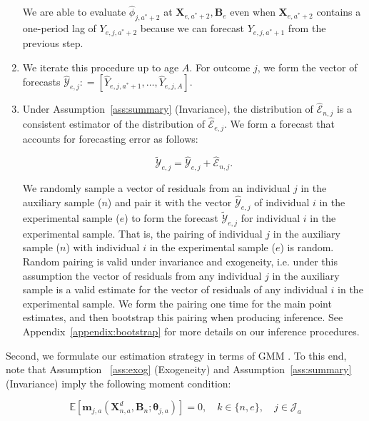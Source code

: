 \begin{enumerate}
\noindent We are able to evaluate $\hat{\phi}_{j,a^*+2}$ at $ \bm{X}_{e,a^*+2}, \bm{B}_e $ even when $\bm{X}_{e,a^*+2}$ contains a one-period lag of $Y_{e,j,a^*+2}$ because we can forecast $Y_{e,j,a^*+1}$ from the previous step.

\item We iterate this procedure up to age $A$. For outcome $j$, we form the vector of forecasts $\hat{\mathcal{Y}}_{e,j} : = \left[ \hat{Y}_{e,j,a^*+1}, \ldots,  \hat{Y}_{e,j,A} \right]$.

\item Under Assumption~\ref{ass:summary} (Invariance), the distribution of $\hat{\mathcal{E}}_{n,j}$ is a consistent estimator of the distribution of $\hat{\mathcal{E}}_{e,j}$. We form a forecast that accounts for forecasting error as follows:

\begin{equation}
\tilde{\mathcal{Y}}_{e,j} = \hat{\mathcal{Y}}_{e,j} + \hat{\mathcal{E}}_{n,j}.
\end{equation}

\noindent We randomly sample a vector of residuals from an individual $j$ in the auxiliary sample ($n$) and pair it with the vector $\hat{\mathcal{Y}}_{e,j}$ of individual $i$ in the experimental sample ($e$) to form the forecast $\tilde{\mathcal{Y}}_{e,j}$ for individual $i$ in the experimental sample. That is, the pairing of individual $j$ in the auxiliary sample ($n$) with individual $i$ in the experimental sample ($e$) is random. Random pairing is valid under invariance and exogeneity, i.e. under this assumption the vector of residuals from any individual $j$ in the auxiliary sample is a valid estimate for the vector of residuals of any individual $i$ in the experimental sample. We form the pairing one time for the main point estimates, and then bootstrap this pairing when producing inference. See Appendix~\ref{appendix:bootstrap} for more details on our inference procedures.
\end{enumerate}

\noindent Second, we formulate our estimation strategy in terms of GMM \citep{Hansen_1982_Econometrica}. To this end, note that Assumption ~\ref{ass:exog} (Exogeneity) and Assumption~\ref{ass:summary} (Invariance) imply the following moment condition:

\begin{equation}
\mathbb{E} \left[ \bm{m}_{j,a} \left( \bm{X}_{n,a}^d, \bm{B}_{n}; \bm{\theta}_{j,a} \right) \right] = 0,  \quad k \in \{n,e\}, \quad j \in \mathcal{J}_a \label{eq:moment}
\end{equation}

